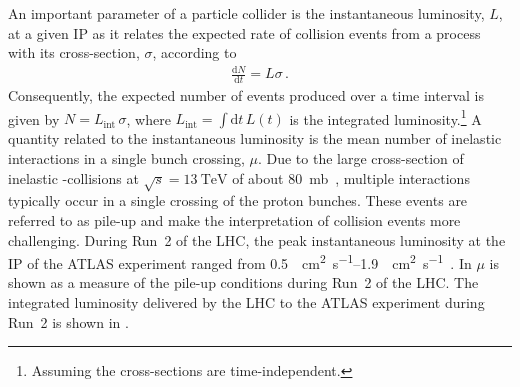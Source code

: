 An important parameter of a particle collider is the instantaneous luminosity,
$L$, at a given IP as it relates the expected rate of collision events from a
process with its cross-section, $\sigma$, according to
\begin{align*}
  \frac{\mathrm{d}N}{\mathrm{d}t} = L \sigma \,\text{.}
\end{align*}
Consequently, the expected number of events produced over a time interval is
given by $N = L_{\text{int}} \, \sigma$, where
$L_{\text{int}} = \int \mathrm{d}t \, L(t)$ is the integrated
luminosity.\footnote{Assuming the cross-sections are time-independent.} A
quantity related to the instantaneous luminosity is the mean number of inelastic
\pp interactions in a single bunch crossing, $\mu$. Due to the large
cross-section of inelastic \pp-collisions at $\sqrt{s} = \SI{13}{\TeV}$ of about
\SI{80}{\milli\barn}~\cite{STDM-2015-05}, multiple interactions typically occur
in a single crossing of the proton bunches. These events are referred to as
pile-up and make the interpretation of collision events more challenging.
During Run~2 of the LHC, the peak instantaneous luminosity at the IP of the
ATLAS experiment ranged from
\SIrange{0.5}{1.9}{\per\centi\metre\squared\per\second}~\cite{ATLAS-CONF-2019-021}.
In  $\mu$ is shown as a measure of the pile-up conditions
during Run~2 of the LHC.
The integrated luminosity delivered by the LHC to the ATLAS experiment during
Run~2 is shown in .



